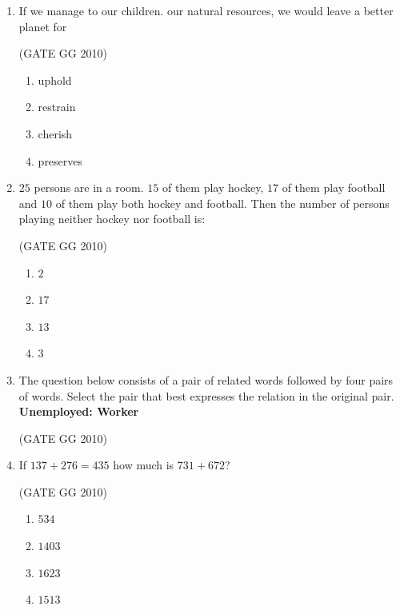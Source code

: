 \documentclass[journal]{IEEEtran}
\begin{document}
\begin{enumerate}[start=26]
\item  If we manage to our children. our natural resources, we would leave a better planet for

\hfill{(GATE GG 2010)}

\begin{enumerate}
    \item  uphold
\item  restrain
\item  cherish
\item  preserves
\end{enumerate}

\item $25$ persons are in a room. $15$ of them play hockey, $17$ of them play football and $10$ of them play both hockey and football. Then the number of persons playing neither hockey nor football is:

\hfill{(GATE GG 2010)}

\begin{enumerate}
\item  $2$
\item  $17$
\item  $13$
\item  $3$
\end{enumerate}
\item The question below consists of a pair of related words followed by four pairs of words. Select the pair that best expresses the relation in the original pair.
\textbf{Unemployed: Worker}

\hfill{(GATE GG 2010)}

\begin{enumerate}
\end{enumerate}

\item If $137 +276 = 435$ how much is $731 + 672$?

\hfill{(GATE GG 2010)}

\begin{enumerate}
    \item  $534$
\item  $1403$
\item  $1623$
\item  $1513$
\end{enumerate}


\end{enumerate}
\end{document}
